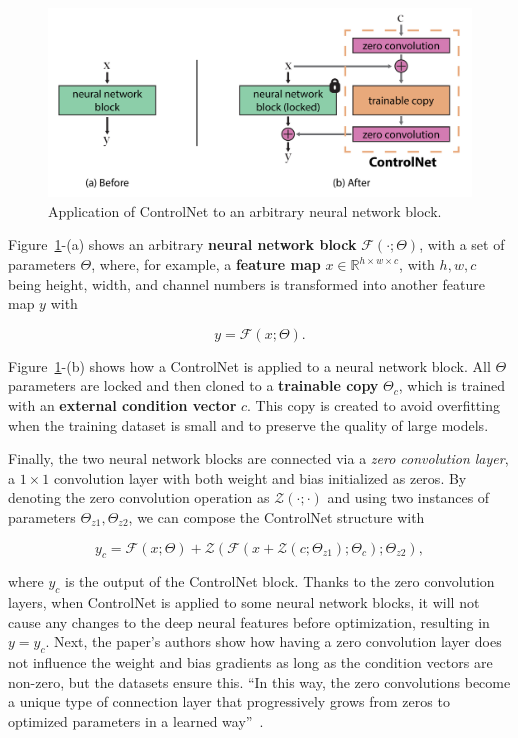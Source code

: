 \documentclass[preprint]{elsarticle}
\begin{document}
\begin{figure}[b]
	\centering
    \includegraphics[scale=0.8]{img/svg/Controlnet1.png}
	\caption{Application of ControlNet to an arbitrary neural network block.}\label{fig:controlnet}
\end{figure}


Figure~\ref{fig:controlnet}-(a) shows an arbitrary \textbf{neural network block} $\mathcal{F}(\cdot;\Theta)$,  with a set of parameters $\Theta$, where, for example, a \textbf{feature map} $x \in \mathbb{R}^{h\times w \times c}$, with ${h,w,c}$  being height, width, and channel numbers is transformed into another feature map $y$ with

\begin{equation}
	y = \mathcal{F}(x;\Theta).
\end{equation}

Figure~\ref{fig:controlnet}-(b) shows how a ControlNet is applied to a neural network block.
All $\Theta$ parameters are locked and then cloned to a \textbf{trainable copy} $\Theta_c$, 
which is trained with an \textbf{external condition vector} $c$.  This copy is created to avoid overfitting when the training dataset is small  and to preserve the quality of large models. 

Finally, the two neural network blocks are connected via a \emph{zero convolution layer},  a $1\times1$ convolution layer with both weight and bias initialized as zeros. By denoting the zero convolution operation as $\mathcal{Z}(\cdot;\cdot)$ and using two instances of parameters ${\Theta_{z1},\Theta_{z2}}$, we can compose the ControlNet structure with

\begin{equation}
	y_c = \mathcal{F}(x;\Theta) + \mathcal{Z}(\mathcal{F}(x+\mathcal{Z}(c;\Theta_{z1});\Theta_c);\Theta_{z2}),
\end{equation}

\noindent where $y_c$ is the output of the ControlNet block. Thanks to the zero convolution layers, when ControlNet is applied to some neural network blocks,  it will not cause any changes to the deep neural features before optimization, resulting in $y=y_c$.
Next, the paper's authors show how having a zero convolution layer does not influence the weight 
and bias gradients as long as the condition vectors are non-zero, but the datasets ensure this.
``In this way, the zero convolutions become a unique type of connection layer that progressively grows from zeros to
optimized parameters in a learned way''~\cite{zhang2023adding}.
\end{document}
